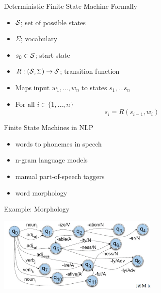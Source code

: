 \documentclass{beamer}
\begin{document}
\begin{frame}{Deterministic Finite State Machine Formally}
  \begin{itemize}
  \item $\mathcal{S}$; set of possible states
  \item $\Sigma$; vocabulary
  \item $s_0 \in \mathcal{S}$; start state 
  \item $R: (\mathcal{S}, \Sigma) \rightarrow \mathcal{S}$;  transition function
  \end{itemize}
  \air 
  \begin{itemize}
  \item Maps input $w_1,\ldots,w_n $ to states $s_1, \ldots s_n$ 
  \item For all $i \in \{1,\ldots,n\}$
    \[ s_i = R(s_{i-1}, w_i)\] 
  \end{itemize}
\end{frame}


\begin{frame}{Finite State Machines in NLP}
  \begin{itemize}
  \item words to phonemes in speech
    \air 
  \item n-gram language models
    \air 
  \item manual part-of-speech taggers
    \air
  \item word morphology
  \end{itemize}
\end{frame}

\begin{frame}{Example: Morphology}
  \begin{center}
    \includegraphics[width=8cm]{morph}
  \end{center}
\end{frame}
\end{document}
